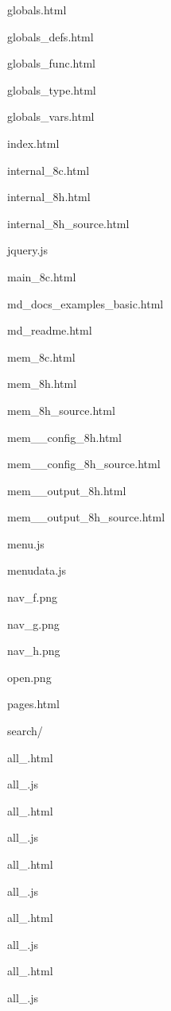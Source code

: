 \begin{DoxyItemize}
\begin{DoxyItemize}
\begin{DoxyItemize}
\item globals.\+html
\item globals\+\_\+defs.\+html
\item globals\+\_\+func.\+html
\item globals\+\_\+type.\+html
\item globals\+\_\+vars.\+html
\item index.\+html
\item internal\+\_\+8c.\+html
\item internal\+\_\+8h.\+html
\item internal\+\_\+8h\+\_\+source.\+html
\item jquery.\+js
\item main\+\_\+8c.\+html
\item md\+\_\+docs\+\_\+examples\+\_\+basic.\+html
\item md\+\_\+readme.\+html
\item mem\+\_\+8c.\+html
\item mem\+\_\+8h.\+html
\item mem\+\_\+8h\+\_\+source.\+html
\item mem\+\_\+\+\_\+config\+\_\+8h.\+html
\item mem\+\_\+\+\_\+config\+\_\+8h\+\_\+source.\+html
\item mem\+\_\+\+\_\+output\+\_\+8h.\+html
\item mem\+\_\+\+\_\+output\+\_\+8h\+\_\+source.\+html
\item menu.\+js
\item menudata.\+js
\item nav\+\_\+f.\+png
\item nav\+\_\+g.\+png
\item nav\+\_\+h.\+png
\item open.\+png
\item pages.\+html
\item search/
\begin{DoxyItemize}
\item all\+\_.\+html
\item all\+\_.\+js
\item all\+\_.\+html
\item all\+\_.\+js
\item all\+\_.\+html
\item all\+\_.\+js
\item all\+\_.\+html
\item all\+\_.\+js
\item all\+\_.\+html
\item all\+\_.\+js

\end{DoxyItemize}
\end{DoxyItemize}
\end{DoxyItemize}
\end{DoxyItemize}
